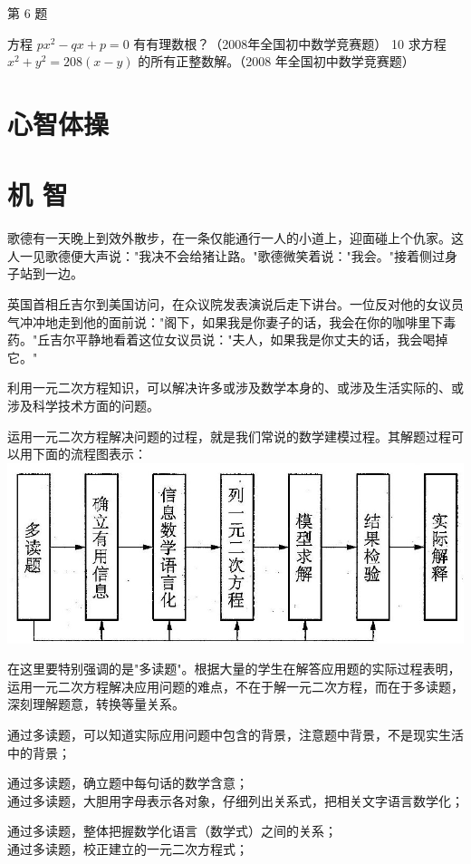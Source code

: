 \documentclass[10pt]{article}
\begin{document}
第 6 题

方程 $p x^{2}-q x+p=0$ 有有理数根？（2008年全国初中数学竞赛题） 10 求方程 $x^{2}+y^{2}=208(x-y)$ 的所有正整数解。（2008 年全国初中数学竞赛题）

\section*{心智体操}
\section*{机 智}
歌德有一天晚上到效外散步，在一条仅能通行一人的小道上，迎面碰上个仇家。这人一见歌德便大声说："我决不会给猪让路。"歌德微笑着说："我会。"接着侧过身子站到一边。

英国首相丘吉尔到美国访问，在众议院发表演说后走下讲台。一位反对他的女议员气冲冲地走到他的面前说："阁下，如果我是你妻子的话，我会在你的咖啡里下毒药。"丘吉尔平静地看着这位女议员说："夫人，如果我是你丈夫的话，我会喝掉它。"

利用一元二次方程知识，可以解决许多或涉及数学本身的、或涉及生活实际的、或涉及科学技术方面的问题。

运用一元二次方程解决问题的过程，就是我们常说的数学建模过程。其解题过程可以用下面的流程图表示：\\
\includegraphics[max width=\textwidth, center]{2024_10_30_26b590fd1106d28139f0g-108}

在这里要特别强调的是"多读题"。根据大量的学生在解答应用题的实际过程表明，运用一元二次方程解决应用问题的难点，不在于解一元二次方程，而在于多读题，深刻理解题意，转换等量关系。

通过多读题，可以知道实际应用问题中包含的背景，注意题中背景，不是现实生活中的背景；

通过多读题，确立题中每句话的数学含意；\\
通过多读题，大胆用字母表示各对象，仔细列出关系式，把相关文字语言数学化；

通过多读题，整体把握数学化语言（数学式）之间的关系；\\
通过多读题，校正建立的一元二次方程式；
\end{document}
